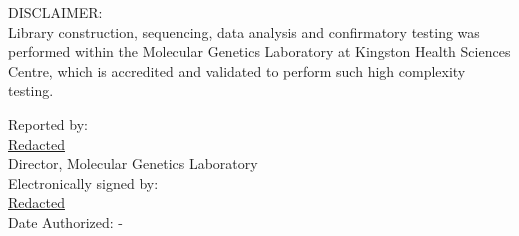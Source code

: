 \documentclass[10pt]{article}
\begin{document}
DISCLAIMER: \\
Library construction, sequencing, data analysis and confirmatory testing was performed within the Molecular Genetics Laboratory at Kingston Health Sciences Centre, which is accredited and validated to perform such high complexity testing.

\hfill \parbox{12cm}{
Reported by:\\
\underline{Redacted }\\
Director, Molecular Genetics Laboratory \\

\vspace{1em}
Electronically signed by: \\
\underline{Redacted}\\
Date Authorized: -
}
\end{document}
